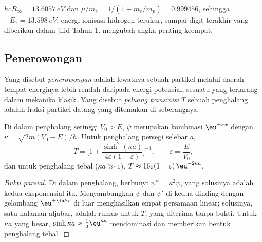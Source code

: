 \begin{example}\label{ex:b3:quantum-model-systems:ie}
$hcR_\infty = \qty{13.6057}{eV}$ dan $\mu/m_e = 1/(1 + m_e/m_p) = 0.999456$,
sehingga $-E_1 = \qty{13.598}{eV}$: energi ionisasi hidrogen terukur, sampai
digit terakhir yang diberikan dalam jilid Tahun 1.  mengubah
angka penting keempat.
\end{example}

\subsection*{Penerowongan}

\begin{definition}\label{def:b3:quantum-model-systems:tunnelling}
Yang disebut \emph{penerowongan} adalah lewatnya sebuah
partikel melalui daerah tempat energinya lebih rendah daripada energi
potensial, sesuatu yang terlarang dalam mekanika klasik. Yang disebut
\emph{peluang transmisi} $T$ sebuah penghalang
adalah fraksi partikel datang yang ditemukan di seberangnya.
\end{definition}

\begin{proposition}\label{prop:b3:quantum-model-systems:barrier}
Di dalam penghalang setinggi $V_0 > E$, $\psi$ merupakan kombinasi
$\eu^{\pm\kappa x}$ dengan $\kappa = \sqrt{2m(V_0 - E)}/\hbar$. Untuk
penghalang persegi selebar $a$,
\[
T = \Big[1 + \frac{\sinh^2(\kappa a)}{4\varepsilon(1-\varepsilon)}\Big]^{-1},
\qquad \varepsilon = \frac{E}{V_0},
\]
dan untuk penghalang tebal ($\kappa a \gg 1$), $T \approx 16\varepsilon(1-\varepsilon)
\,\eu^{-2\kappa a}$.
\end{proposition}

\begin{proof}[Bukti parsial]
Di dalam penghalang,  berbunyi $\psi'' = \kappa^2\psi$,
yang solusinya adalah kedua eksponensial itu. Menyambungkan $\psi$ dan
$\psi'$ di kedua dinding dengan gelombang $\eu^{\pm\iu kx}$ di luar
menghasilkan empat persamaan linear; solusinya, satu halaman aljabar, adalah
rumus untuk $T$, yang diterima tanpa bukti. Untuk $\kappa a$ yang besar,
$\sinh\kappa a \approx \frac12\eu^{\kappa a}$ mendominasi dan memberikan bentuk
penghalang tebal.
\end{proof}

